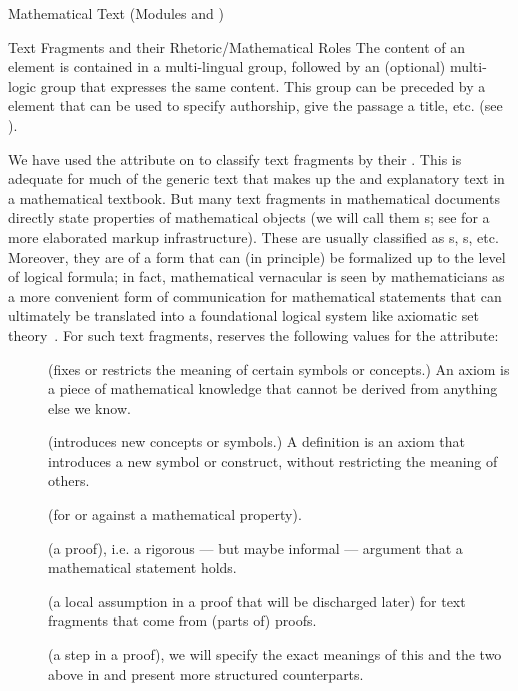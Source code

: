 \begin{tchapter}[id=mtxt,short=Mathematical Text]{Mathematical Text (Modules
   and )}
\begin{tsection}[id=omtext]{Text Fragments and their Rhetoric/Mathematical Roles}
  The content of an  element is 
  contained in a multi-lingual  group, followed by an (optional)
  multi-logic  group that expresses the same content.  This
   group can be preceded by a  element that can be used
  to specify authorship, give the passage a title, etc. (see ).

  We have used the  attribute on  to classify
  text fragments by their . This is adequate for much of the
  generic text that makes up the  and explanatory text in a
  mathematical textbook. But many text fragments in mathematical documents directly state
  properties of mathematical objects (we will call them
  s; see {} for a more elaborated
  markup infrastructure). These are usually classified as s,
  s, etc.  Moreover, they are of a form that can (in principle) be
  formalized up to the level of logical formula; in fact, mathematical vernacular is seen
  by mathematicians as a more convenient form of communication for mathematical statements
  that can ultimately be translated into a foundational logical system like axiomatic set
  theory~\cite{Bernays:ast91}.  For such text fragments, \omdoc reserves the following
  values for the  attribute:
\begin{description}
\item[] (fixes or restricts the meaning of certain
  symbols or concepts.) An axiom is a piece of mathematical knowledge that cannot
  be derived from anything else we know.
\item[] (introduces new concepts or symbols.) A
  definition is an axiom that introduces a new symbol or construct, without restricting
  the meaning of others.
\item[] (for or against a mathematical property).
\item[] (a proof), i.e. a rigorous --- but maybe informal
  --- argument that a mathematical statement holds.
\item[] (a local assumption in a proof that will be
  discharged later) for text fragments that come from (parts of) proofs.
\item[] (a step in a proof), we will specify the exact
  meanings of this and the two above in  and present more structured
  counterparts.
\end{description} 


\end{tsection}
\end{tchapter}
